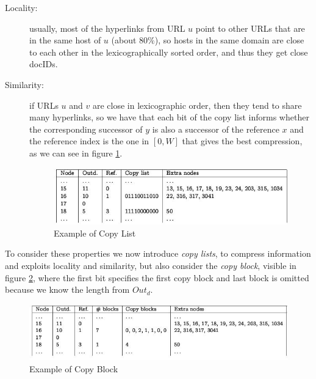 \begin{description}
	    \item [Locality: ] usually, most of the hyperlinks from URL $u$ point to other URLs that are in the same host of $u$ (about $80\%$), so hosts in the same domain are 
		               close to each other in the lexicographically sorted order, and thus they get close docIDs.

	    \item [Similarity: ] if URLs $u$ and $v$ are close in lexicographic order, then they tend to share many hyperlinks, so we have that each bit of the copy list informs 
		                 whether the corresponding successor of $y$ is also a successor of the reference $x$ and the reference index is the one in $[0, W]$ that gives the best compression,
				 as we can see in figure \ref{img:copyList}.

				 \begin{figure}
					\caption{Example of Copy List}
					\label{img:copyList}
					\includegraphics[width=\textwidth]{Images/compressedAdjancency}
				 \end{figure} 
    \end{description}
    To consider these properties we now introduce \emph{copy lists}, to compress information and exploits locality and similarity, but also consider the \emph{copy block}, 
    visible in figure \ref{img:copyBlock}, where the first bit specifies the first copy block and last block is omitted because we know the length from $Out_d$.

    \begin{figure}
	\caption{Example of Copy Block}
	\label{img:copyBlock}
	\includegraphics[width=\textwidth]{Images/copyBlock}
    \end{figure}

